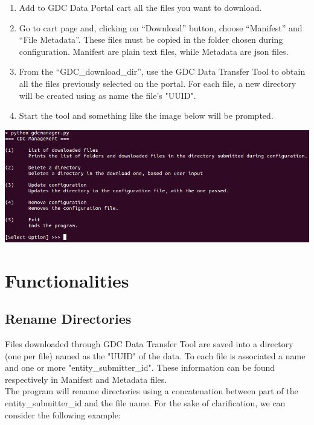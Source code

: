 \documentclass[hidelinks,12pt]{article}
\begin{document}
\begin{enumerate}
\item Add to GDC Data Portal cart all the files you want to download.
\item Go to cart page and, clicking on ``Download'' button, choose ``Manifest'' and ``File Metadata''. These files must be copied in the folder chosen during configuration. Manifest are plain text files, while Metadata are json files.
\item From the ``GDC\_download\_dir'', use the GDC Data Transfer Tool to obtain all the files previously selected on the portal. For each file, a new directory will be created using as name the file's "UUID".
\item Start the tool and something like the image below will be prompted.

\end{enumerate}

\vspace{20 pt}
\begin{center}
\includegraphics[scale = 0.45]{menu_picture.png}\\[0.5 cm]
\end{center}


\section{Functionalities}


\subsection{Rename Directories}
Files downloaded through GDC Data Transfer Tool are saved into a directory (one per file) named as the "UUID" of the data. To each file is associated a name and one or more "entity\_submitter\_id". These information can be found respectively in Manifest and Metadata files.\\
The program will rename directories using a concatenation between part of the entity\_submitter\_id and the file name.
For the sake of clarification, we can consider the following example:\\
\end{document}
